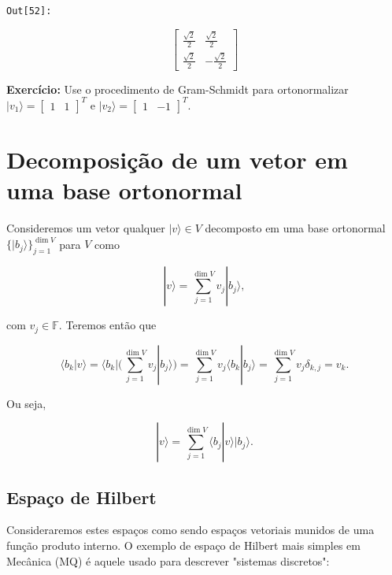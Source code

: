 \documentclass[11pt]{article}
\begin{document}
\texttt{\color{outcolor}Out[{\color{outcolor}52}]:}
    
    $$\left[\begin{matrix}\frac{\sqrt{2}}{2} & \frac{\sqrt{2}}{2}\\\frac{\sqrt{2}}{2} & - \frac{\sqrt{2}}{2}\end{matrix}\right]$$

    

    \textbf{Exercício:} Use o procedimento de Gram-Schmidt para
ortonormalizar
\(|v_{1}\rangle = \begin{bmatrix} 1 & 1\end{bmatrix}^{T}\) e
\(|v_{2}\rangle = \begin{bmatrix} 1 & -1\end{bmatrix}^{T}\).

    \section{Decomposição de um vetor em uma base
ortonormal}\label{decomposiuxe7uxe3o-de-um-vetor-em-uma-base-ortonormal}

Consideremos um vetor qualquer \(|v\rangle\in V\) decomposto em uma base
ortonormal \(\{|b_{j}\rangle\}_{j=1}^{\dim V}\) para \(V\) como

\begin{equation}
|v\rangle = \sum_{j=1}^{\dim V}v_{j}|b_{j}\rangle,
\end{equation}

com \(v_{j}\in\mathbb{F}\). Teremos então que

\begin{equation}
\langle b_{k}|v\rangle = \langle b_{k}|(\sum_{j=1}^{\dim V}v_{j}|b_{j}\rangle) = \sum_{j=1}^{\dim V}v_{j}\langle b_{k}|b_{j}\rangle = \sum_{j=1}^{\dim V}v_{j}\delta_{k,j} = v_{k}.
\end{equation}

Ou seja,

\begin{equation}
|v\rangle = \sum_{j=1}^{\dim V}\langle b_{j}|v\rangle|b_{j}\rangle.
\end{equation}

    \subsection{Espaço de Hilbert}\label{espauxe7o-de-hilbert}

Consideraremos estes espaços como sendo espaços vetoriais munidos de uma
função produto interno. O exemplo de espaço de Hilbert mais simples em
Mecânica (MQ) é aquele usado para descrever "sistemas discretos":
\end{document}
